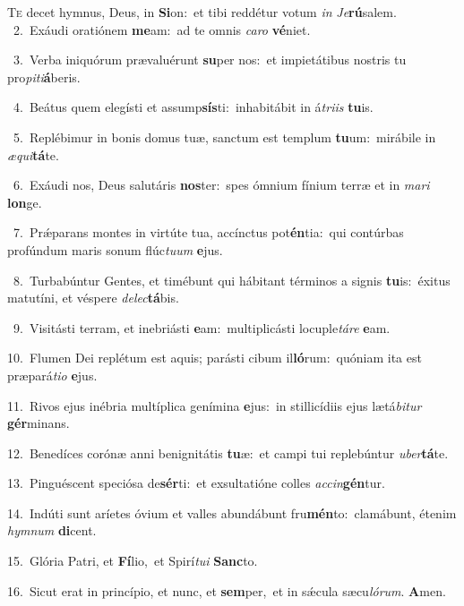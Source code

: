 \lettrine{\initial\textcolor{\initialcolor}{T}}{e} decet hymnus, Deus, in \textbf{Si}\-on:~\star et tibi reddétur votum \textit{in} \textit{Je}\-\textbf{rú}salem.\\
{\numbfont\textcolor{\numbcolor}{~2.}}~Exáudi oratiónem \textbf{me}\-am:~\star ad te omnis \textit{ca}\-\textit{ro} \textbf{vé}\-niet.\par
{\numbfont\textcolor{\numbcolor}{~3.}}~Verba iniquórum prævaluérunt \textbf{su}\-per nos:~\star et impietátibus nostris tu pro\-\textit{pi}\-\textit{ti}\textbf{á}beris.\par
{\numbfont\textcolor{\numbcolor}{~4.}}~Beátus quem elegísti et assump\-\textbf{sís}\-ti:~\star inhabitábit in á\-\textit{tri}\-\textit{is} \textbf{tu}\-is.\par
{\numbfont\textcolor{\numbcolor}{~5.}}~Replébimur in bonis domus tuæ, sanctum est templum \textbf{tu}\-um:~\star mirábile in \textit{æ}\-\textit{qui}\textbf{tá}te.\par
{\numbfont\textcolor{\numbcolor}{~6.}}~Exáudi nos, Deus salutáris \textbf{nos}\-ter:~\star spes ómnium fínium terræ et in \textit{ma}\-\textit{ri} \textbf{lon}\-ge.\par
{\numbfont\textcolor{\numbcolor}{~7.}}~Prǽparans montes in virtúte tua, accínctus pot\-\textbf{én}\-tia:~\star qui contúrbas profúndum maris sonum flúc\-\textit{tu}\-\textit{um} \textbf{e}\-jus.\par
{\numbfont\textcolor{\numbcolor}{~8.}}~Turbabúntur Gentes, et timébunt qui hábitant términos a signis \textbf{tu}\-is:~\star éxitus matutíni, et véspere \textit{de}\-\textit{lec}\textbf{tá}bis.\par
{\numbfont\textcolor{\numbcolor}{~9.}}~Visitásti terram, et inebriásti \textbf{e}\-am:~\star multiplicásti locuple\-\textit{tá}\-\textit{re} \textbf{e}\-am.\par
{\numbfont\textcolor{\numbcolor}{10.}}~Flumen Dei replétum est aquis; parásti cibum il\-\textbf{ló}\-rum:~\star quóniam ita est præpará\-\textit{ti}\-\textit{o} \textbf{e}\-jus.\par
{\numbfont\textcolor{\numbcolor}{11.}}~Rivos ejus inébria multíplica genímina \textbf{e}\-jus:~\star in stillicídiis ejus lætá\-\textit{bi}\-\textit{tur} \textbf{gér}\-minans.\par
{\numbfont\textcolor{\numbcolor}{12.}}~Benedíces corónæ anni benignitátis \textbf{tu}\-æ:~\star et campi tui replebúntur \textit{u}\-\textit{ber}\textbf{tá}te.\par
{\numbfont\textcolor{\numbcolor}{13.}}~Pinguéscent speciósa de\-\textbf{sér}\-ti:~\star et exsultatióne colles \textit{ac}\-\textit{cin}\textbf{gén}tur.\par
{\numbfont\textcolor{\numbcolor}{14.}}~Indúti sunt aríetes óvium et valles abundábunt fru\-\textbf{mén}\-to:~\star clamábunt, étenim \textit{hym}\-\textit{num} \textbf{di}\-cent.\par
{\numbfont\textcolor{\numbcolor}{15.}}~Glória Patri, et \textbf{Fí}\-lio,~\star et Spirí\-\textit{tu}\-\textit{i} \textbf{Sanc}\-to.\par
{\numbfont\textcolor{\numbcolor}{16.}}~Sicut erat in princípio, et nunc, et \textbf{sem}\-per,~\star et in sǽcula sæcu\-\textit{ló}\-\textit{rum}. \textbf{A}\-men.\par
